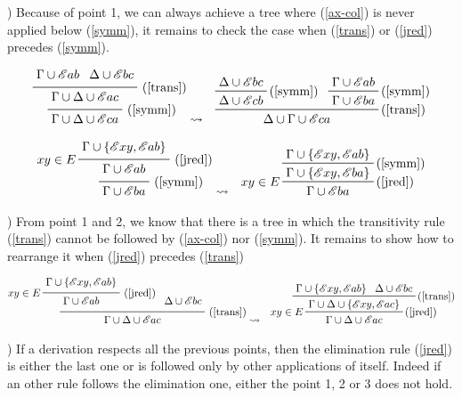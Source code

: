 \documentclass[a4paper,12pt,oneside]{book}
\newcommand{\E}{\mathscr{E}}
\begin{document}
) Because of point 1, we can always achieve a tree where (\ref{ax-col}) is never applied below (\ref{symm}), it remains to check the case when  (\ref{trans}) or (\ref{jred}) precedes (\ref{symm}).

\begin{eqnarray*}
\prfrulenameskip=0.4em\prflinepadbefore=1ex
\prftree[r]{(\ref{symm})} {\prftree[r]{(\ref{trans})}{\Gamma\cup \E ab  }{\Delta\cup \E bc}
{\Gamma\cup\Delta\cup \E ac } 
 }{\Gamma\cup\Delta\cup\E ca } 
& \leadsto
&\prftree[r]{(\ref{trans})} 
 { \prftree[r]{(\ref{symm})}{\Delta\cup\E bc } { \Delta\cup\E cb  } }
 {\prftree[r]{(\ref{symm})}{\Gamma\cup\E ab} { \Gamma\cup\E ba  } }
{\Delta\cup\Gamma\cup\E ca}
 \end{eqnarray*}


\begin{eqnarray*}
\prfrulenameskip=0.4em\prflinepadbefore=1ex
\prftree[r]{(\ref{symm})} 
{\prftree[l,r]{(\ref{jred})}{$xy \in E$}{\Gamma \cup \{\E xy ,\E ab \}}{\Gamma \cup \E ab }}
{\Gamma  \cup \E ba }
& \leadsto
&\prftree[l,r]{(\ref{jred})}{$xy \in E$} 
{\prftree[r]{(\ref{symm})}
{\Gamma \cup \{\E xy ,\E ab \}}
{\Gamma\cup \{\E xy , \E ba \} }}
{\Gamma \cup \E ba }
 \end{eqnarray*}



) From point 1 and 2, we know that there is a tree in which the transitivity rule (\ref{trans}) cannot be followed by (\ref{ax-col}) nor (\ref{symm}). It remains to show how to rearrange it when (\ref{jred}) precedes (\ref{trans})

\begin{eqnarray*}
\prfrulenameskip=0.4em\prflinepadbefore=1ex
\prftree[r]{(\ref{trans})} 
{\prftree[l,r]{(\ref{jred})}{$xy \in E$}{\Gamma \cup \{\E xy ,\E ab \}}{\Gamma \cup \E ab }}
{ \prfassumption{\Delta \cup \E bc  }}
{\Gamma \cup \Delta \cup \E ac }
& \leadsto
&\prftree[l,r]{(\ref{jred})}{$xy \in E$} 
{\prftree[r]{(\ref{trans})}
{\Gamma \cup \{\E xy ,\E ab \}}{\Delta \cup \E bc }
{\Gamma\cup\Delta \cup \{\E xy , \E ac \} }}
{\Gamma \cup \Delta \cup \E ac }
 \end{eqnarray*}

) If a derivation respects all the previous points, then the elimination rule (\ref{jred}) is either the last one or is followed only by other applications of itself. Indeed if an other rule follows the elimination one, either the point 1, 2 or 3 does not hold.
\end{document}
